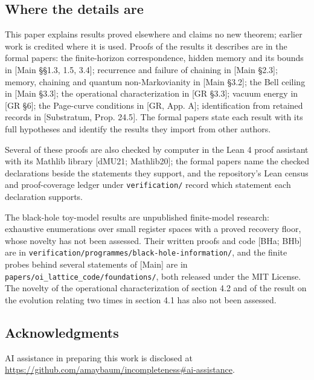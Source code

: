 \documentclass[
]{article}
\begin{document}
\hypertarget{where-the-details-are}{%
\subsection{Where the details are}\label{where-the-details-are}}

This paper explains results proved elsewhere and claims no new theorem;
earlier work is credited where it is used. Proofs of the results it
describes are in the formal papers: the finite-horizon correspondence,
hidden memory and its bounds in {[}Main §§1.3, 1.5, 3.4{]}; recurrence
and failure of chaining in {[}Main §2.3{]}; memory, chaining and quantum
non-Markovianity in {[}Main §3.2{]}; the Bell ceiling in {[}Main
§3.3{]}; the operational characterization in {[}GR §3.3{]}; vacuum
energy in {[}GR §6{]}; the Page-curve conditions in {[}GR, App. A{]};
identification from retained records in {[}Substratum, Prop. 24.5{]}.
The formal papers state each result with its full hypotheses and
identify the results they import from other authors.

Several of these proofs are also checked by computer in the Lean 4 proof
assistant with its Mathlib library {[}dMU21; Mathlib20{]}; the formal
papers name the checked declarations beside the statements they support,
and the repository's Lean census and proof-coverage ledger under
\texttt{verification/} record which statement each declaration supports.

The black-hole toy-model results are unpublished finite-model research:
exhaustive enumerations over small register spaces with a proved
recovery floor, whose novelty has not been assessed. Their written
proofs and code {[}BHa; BHb{]} are in
\texttt{verification/programmes/black-hole-information/}, and the finite
probes behind several statements of {[}Main{]} are in
\texttt{papers/oi\_lattice\_code/foundations/}, both released under the
MIT License. The novelty of the operational characterization of section
4.2 and of the result on the evolution relating two times in section 4.1
has also not been assessed.

\hypertarget{acknowledgments}{%
\subsection{Acknowledgments}\label{acknowledgments}}

AI assistance in preparing this work is disclosed at\\
\url{https://github.com/amaybaum/incompleteness\#ai-assistance}.
\end{document}
